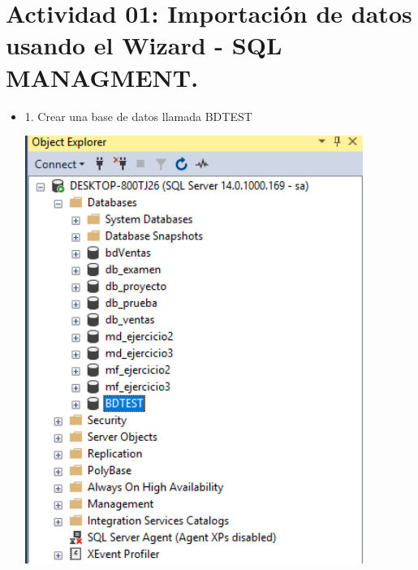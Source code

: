 \section{Actividad 01: Importación de datos usando el Wizard - SQL MANAGMENT.} 

\begin{itemize}

 \item 1. Crear una base de datos llamada BDTEST\\
	\begin{center}
	\includegraphics[width=11cm]{./Imagenes/imagen1}
	\end{center}	



\end{itemize}
